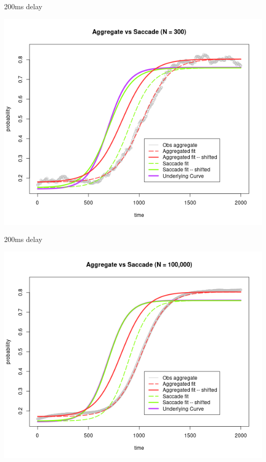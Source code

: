 \documentclass{beamer}
\begin{document}
\begin{frame}{200ms delay}
\begin{center}
\includegraphics[scale=0.45]{img/new_delay1.png}
\end{center}
\end{frame}

\begin{frame}{200ms delay}
\begin{center}
\includegraphics[scale=0.45]{img/new_delay2.png}
\end{center}
\end{frame}
\end{document}
